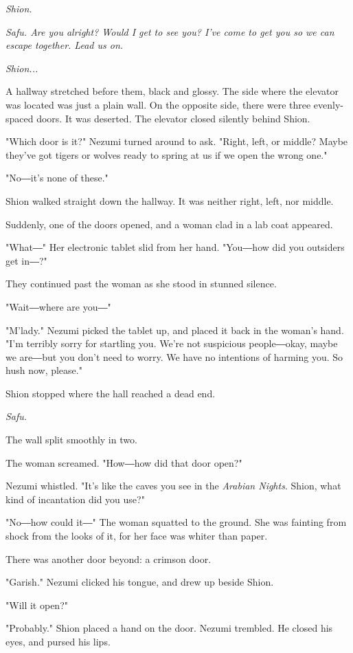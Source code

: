 \emph{Shion.}

\emph{Safu. Are you alright? Would I get to see you? I've come to get you so
we can escape together. Lead us on.}

\emph{Shion...}

A hallway stretched before them, black and glossy. The side where the
elevator was located was just a plain wall. On the opposite side, there
were three evenly-spaced doors. It was deserted. The elevator closed
silently behind Shion.

"Which door is it?" Nezumi turned around to ask. "Right, left, or
middle? Maybe they've got tigers or wolves ready to spring at us if we
open the wrong one."

"No―it's none of these."

Shion walked straight down the hallway. It was neither right, left, nor
middle.

Suddenly, one of the doors opened, and a woman clad in a lab coat
appeared.

"What―" Her electronic tablet slid from her hand. "You―how did you
outsiders get in―?"

They continued past the woman as she stood in stunned silence.

"Wait―where are you―"

"M'lady." Nezumi picked the tablet up, and placed it back in the woman's
hand. "I'm terribly sorry for startling you. We're not suspicious
people―okay, maybe we are―but you don't need to worry. We have no
intentions of harming you. So hush now, please."

Shion stopped where the hall reached a dead end.

\emph{Safu.}

The wall split smoothly in two.

The woman screamed. "How―how did that door open?"

Nezumi whistled. "It's like the caves you see in the \emph{Arabian Nights}.
Shion, what kind of incantation did you use?"

"No―how could it―" The woman squatted to the ground. She was fainting
from shock from the looks of it, for her face was whiter than paper.

There was another door beyond: a crimson door.

"Garish." Nezumi clicked his tongue, and drew up beside Shion.~

"Will it open?"

"Probably." Shion placed a hand on the door. Nezumi trembled. He closed
his eyes, and pursed his lips.

